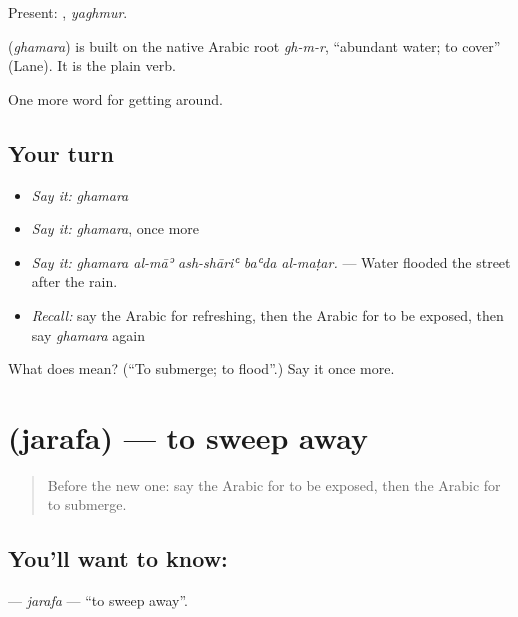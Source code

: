 Present: , \emph{yaghmur}.

\begin{cousinweb}
\textbf{} (\emph{ghamara}) is built on the native Arabic root \emph{gh-m-r}, \textquotedblleft{}abundant water; to cover\textquotedblright{} (Lane). It is the plain verb.
\end{cousinweb}

\begin{grammarlens}[title={What you've built}]
One more word for getting around.
\end{grammarlens}

\subsection*{Your turn}
\begin{itemize}
\raggedright
  \item \emph{Say it:} \emph{ghamara}
  \item \emph{Say it:} \emph{ghamara}, once more
  \item \emph{Say it:} \emph{ghamara al-māʾ ash-shāriʿ baʿda al-maṭar.} — Water flooded the street after the rain.
  \item \emph{Recall:} say the Arabic for refreshing, then the Arabic for to be exposed, then say \emph{ghamara} again
\end{itemize}

\begin{tcolorbox}[breakable,colback=teal!4,colframe=teal!35!black,title={Before you move on}]
What does  mean? (\textquotedblleft{}To submerge; to flood\textquotedblright{}.) Say it once more.
\end{tcolorbox}
\section[\texorpdfstring{\ar{جرف} (jarafa)}{جرف (jarafa)}]{ (jarafa) — to sweep away}

\label{lesson:AR-C487-jarafa}



\begin{quote}
Before the new one: say the Arabic for to be exposed, then the Arabic for to submerge.
\end{quote}

\subsection*{You'll want to know: }
\textbf{} — \emph{jarafa} — \textquotedblleft{}to sweep away\textquotedblright{}.

